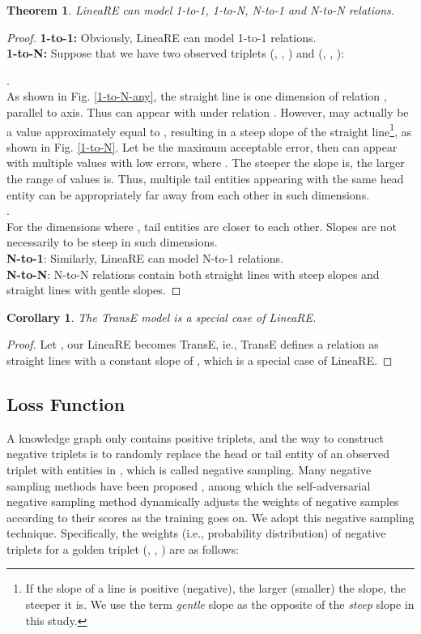 \documentclass[conference]{IEEEtran}
\newtheorem{theorem}{Theorem}
\newtheorem{corollary}{Corollary}
\begin{document}
\begin{theorem}
	LineaRE can model 1-to-1, 1-to-N, N-to-1 and N-to-N relations.
\end{theorem}
\begin{proof}
	\textbf{1-to-1:} Obviously, LineaRE can model 1-to-1 relations. \\
	\textbf{1-to-N:} Suppose that we have two observed triplets (, , ) and (, , ):
	\begin{flushleft}
		
	\end{flushleft}
	. \\
	As shown in Fig. \ref{1-to-N-any}, the straight line is one dimension of relation , parallel to  axis. Thus  can appear with  under relation .
	However,  may actually be a value approximately equal to , resulting in a steep slope of the straight line\footnote{If the slope of a line is positive (negative), the larger (smaller) the slope, the steeper it is. We use the term \textit{gentle} slope as the opposite of the \textit{steep} slope in this study.}, as shown in Fig. \ref{1-to-N}.
	Let  be the maximum acceptable error, then  can appear with multiple  values with low errors, where . The steeper the slope is, the larger the range of  values is. Thus, multiple tail entities appearing with the same head entity can be appropriately far away from each other in such dimensions. \\
	. \\
	For the dimensions where , tail entities are closer to each other. Slopes are not necessarily to be steep in such dimensions. \\
	\textbf{N-to-1}: Similarly, LineaRE can model N-to-1 relations. \\
	\textbf{N-to-N}: N-to-N relations contain both straight lines with steep slopes and straight lines with gentle slopes.
\end{proof}

\begin{corollary}
	The TransE model is a special case of LineaRE.
\end{corollary}
\begin{proof}
	Let , our LineaRE becomes TransE, ie., TransE defines a relation as straight lines with a constant slope of , which is a special case of LineaRE.
\end{proof}

\subsection{Loss Function}
A knowledge graph only contains positive triplets, and the way to construct negative triplets is to randomly replace the head or tail entity of an observed triplet with entities in , which is called negative sampling. Many negative sampling methods have been proposed \cite{Kbgan,NSCaching,IGAN}, among which the self-adversarial negative sampling method \cite{RotatE} dynamically adjusts the weights of negative samples according to their scores as the training goes on. We adopt this negative sampling technique. Specifically, the weights (i.e., probability distribution) of negative triplets for a golden triplet (, , ) are as follows:
\end{document}
